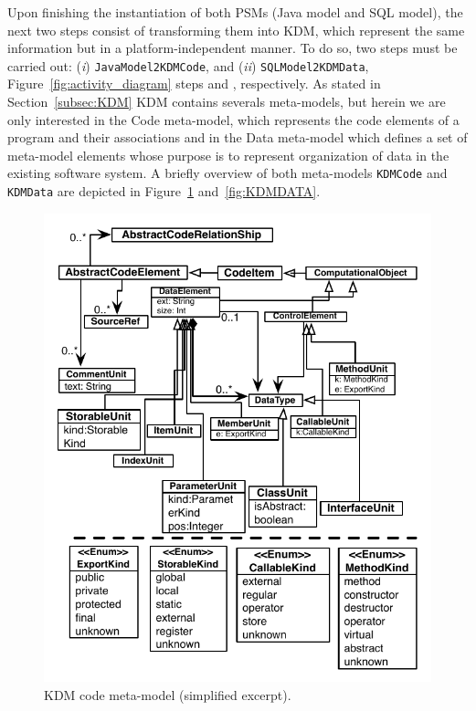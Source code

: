 \documentclass[a4paper,twoside]{article}
\newcommand*\circled[1]{\tikz[baseline=(char.base)]{
  \node[shape=circle,draw, inner sep=0.1pt] (char) {#1};}
}
\begin{document}
Upon finishing the instantiation of both PSMs (Java model and SQL model), the next two steps consist of transforming them into KDM, which represent the same information but in a platform-independent manner. To do so, two steps must be carried out: (\textit{i}) \texttt{JavaModel2KDMCode}, and (\textit{ii}) \texttt{SQLModel2KDMData}, Figure~\ref{fig:activity_diagram} steps \circled{\textbf{E}} and \circled{\textbf{F}}, respectively. %
As stated in Section~\ref{subsec:KDM} KDM contains severals meta-models, but herein we are only interested in the Code meta-model, which represents the code elements of a program and their associations and in the Data meta-model which defines a set of meta-model elements whose purpose is to represent organization of data in the existing software system. A briefly overview of both meta-models \texttt{KDMCode} and \texttt{KDMData} are depicted in Figure~\ref{fig:KDMSOurce} and~\ref{fig:KDMDATA}. 


\begin{figure}[!h]
\centering
  \includegraphics[scale=0.70]{figuras/KDM-Program-Layer}
\caption{KDM code meta-model (simplified excerpt).}
\label{fig:KDMSOurce}
\end{figure}
\end{document}
